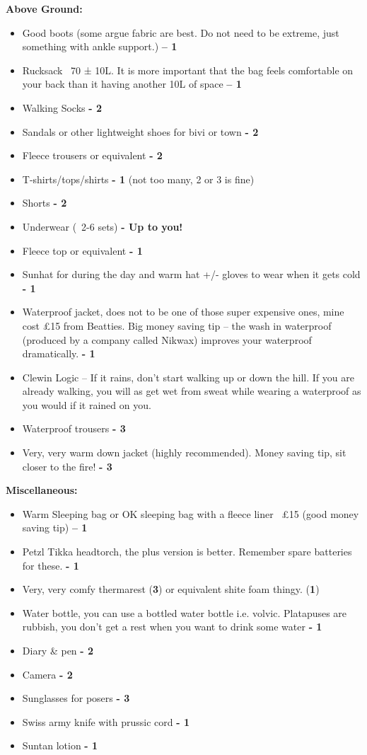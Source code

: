 \textbf{Above Ground:}
\begin{itemize}
    \item Good boots (some argue fabric are best. Do not need to be extreme, just something with ankle support.) \textbf{– 1}
    \item Rucksack ~70 ± 10L. It is more important that the bag feels comfortable on your back than it having another 10L of space \textbf{– 1}
    \item Walking Socks \textbf{- 2}
    \item Sandals or other lightweight shoes for bivi or town \textbf{- 2}
    \item Fleece trousers or equivalent \textbf{- 2}
    \item T-shirts/tops/shirts \textbf{- 1} (not too many, 2 or 3 is fine)
    \item Shorts \textbf{- 2}
    \item Underwear (~2-6 sets) \textbf{- Up to you!}
    \item Fleece top or equivalent \textbf{- 1}
    \item Sunhat for during the day and warm hat +/- gloves to wear when it gets cold \textbf{- 1}
    \item Waterproof jacket, does not to be one of those super expensive ones, mine cost £15 from Beatties. Big money saving tip – the wash in waterproof  (produced by a company called Nikwax) improves your waterproof dramatically. \textbf{- 1}
        \item Clewin Logic – If it rains, don’t start walking up or down the hill. If you are already walking, you will as get wet from sweat while wearing a waterproof as you would if it rained on you.
    \item Waterproof trousers \textbf{- 3}
    \item Very, very warm down jacket (highly recommended). Money saving tip, sit closer to the fire! \textbf{- 3}
\end{itemize}

\textbf{Miscellaneous:}
\begin{itemize}
    \item Warm Sleeping bag or OK sleeping bag with a fleece liner ~£15 (good money saving tip) \textbf{– 1}
    \item Petzl Tikka headtorch, the plus version is better. Remember spare batteries for these. \textbf{- 1}
    \item Very, very comfy thermarest (\textbf{3}) or equivalent shite foam thingy. (\textbf{1})
    \item Water bottle, you can use a bottled water bottle i.e. volvic. Platapuses are rubbish, you don’t get a rest when you want to drink some water \textbf{- 1}
    \item Diary \& pen \textbf{- 2}
    \item Camera \textbf{- 2}
    \item Sunglasses for posers \textbf{- 3}
    \item Swiss army knife with prussic cord \textbf{- 1}
    \item Suntan lotion \textbf{- 1}
\end{itemize}


